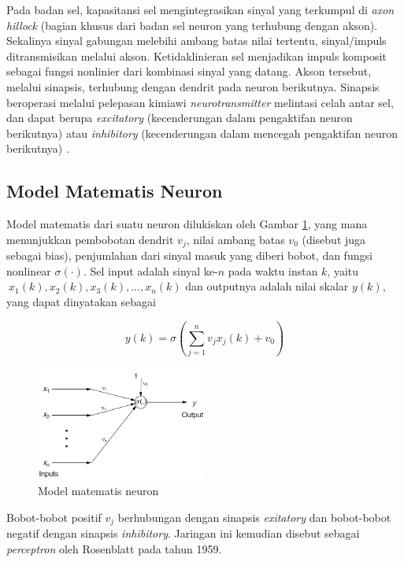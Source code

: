 Pada badan sel, kapasitansi sel mengintegrasikan sinyal yang terkumpul di \textit{axon hillock} (bagian khusus dari badan sel neuron yang terhubung dengan akson). Sekalinya sinyal gabungan melebihi ambang batas nilai tertentu, sinyal/impuls ditransmisikan melalui akson. Ketidaklinieran sel menjadikan impuls komposit sebagai fungsi nonlinier dari kombinasi sinyal yang datang. Akson tersebut, melalui sinapsis, terhubung dengan dendrit pada neuron berikutnya. Sinapsis beroperasi melalui pelepasan kimiawi \textit{neurotransmitter} melintasi celah antar sel, dan dapat berupa \textit{excitatory} (kecenderungan dalam pengaktifan neuron berikutnya) atau \textit{inhibitory} (kecenderungan dalam mencegah pengaktifan neuron berikutnya) \cite{NNControlBook}.

\subsection{Model Matematis Neuron}

Model matematis dari suatu neuron dilukiskan oleh Gambar \ref{fig:3:math}, yang mana menunjukkan pembobotan dendrit $v_j$, nilai ambang batas $v_0$ (disebut juga sebagai bias), penjumlahan dari sinyal masuk yang diberi bobot, dan fungsi nonlinear $\sigma(\cdot)$. Sel input adalah sinyal ke-$n$ pada waktu instan $k$, yaitu $\ x_1(k), x_2(k), x_3(k), ..., x_n(k)$ dan outputnya adalah nilai skalar $y(k)$, yang dapat dinyatakan sebagai

\begin{equation} \label{eq:3:perceptron}
y(k) = \sigma \left( \sum_{j=1}^{n}v_jx_j(k)+v_0 \right)
\end{equation}

\begin{figure}[!h]
	\centering
	\includegraphics[width=0.5\textwidth]{figures/neuronmath}
	\caption{Model matematis neuron \cite{NNControlBook}}
	\label{fig:3:math}
\end{figure}

Bobot-bobot positif  $v_j$ berhubungan dengan sinapsis \textit{exitatory} dan bobot-bobot negatif dengan sinapsis \textit{inhibitory}. Jaringan ini kemudian disebut sebagai \textit{perceptron} oleh Rosenblatt pada tahun 1959. \cite{NNControlBook}


